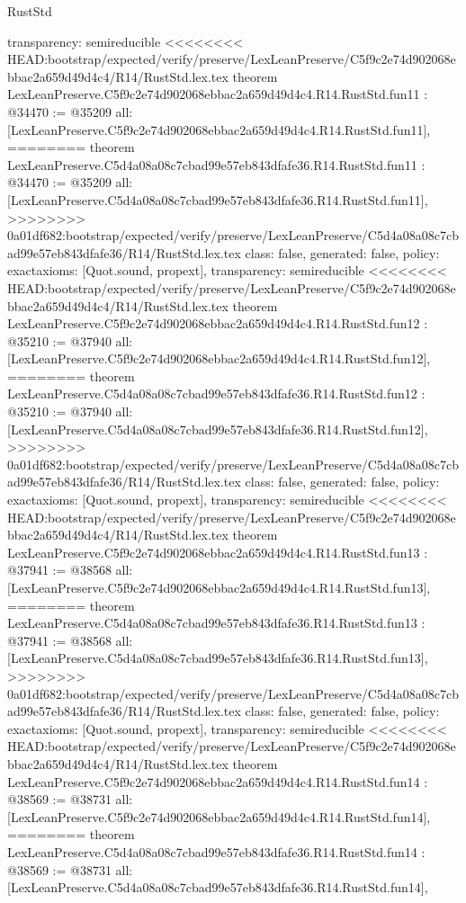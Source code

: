 \begin{lexlean}{RustStd}
\begin{coremodule}
{\begin{coremodule}
{{{{{{{{{{{{{{  transparency: semireducible
}
<<<<<<<< HEAD:bootstrap/expected/verify/preserve/LexLeanPreserve/C5f9c2e74d902068ebbac2a659d49d4c4/R14/RustStd.lex.tex
theorem LexLeanPreserve.C5f9c2e74d902068ebbac2a659d49d4c4.R14.RustStd.fun11 : @34470 := @35209 {
  all: [LexLeanPreserve.C5f9c2e74d902068ebbac2a659d49d4c4.R14.RustStd.fun11],
========
theorem LexLeanPreserve.C5d4a08a08c7cbad99e57eb843dfafe36.R14.RustStd.fun11 : @34470 := @35209 {
  all: [LexLeanPreserve.C5d4a08a08c7cbad99e57eb843dfafe36.R14.RustStd.fun11],
>>>>>>>> 0a01df682:bootstrap/expected/verify/preserve/LexLeanPreserve/C5d4a08a08c7cbad99e57eb843dfafe36/R14/RustStd.lex.tex
  class: false,
  generated: false,
  policy: exact{axioms: [Quot.sound, propext]},
  transparency: semireducible
}
<<<<<<<< HEAD:bootstrap/expected/verify/preserve/LexLeanPreserve/C5f9c2e74d902068ebbac2a659d49d4c4/R14/RustStd.lex.tex
theorem LexLeanPreserve.C5f9c2e74d902068ebbac2a659d49d4c4.R14.RustStd.fun12 : @35210 := @37940 {
  all: [LexLeanPreserve.C5f9c2e74d902068ebbac2a659d49d4c4.R14.RustStd.fun12],
========
theorem LexLeanPreserve.C5d4a08a08c7cbad99e57eb843dfafe36.R14.RustStd.fun12 : @35210 := @37940 {
  all: [LexLeanPreserve.C5d4a08a08c7cbad99e57eb843dfafe36.R14.RustStd.fun12],
>>>>>>>> 0a01df682:bootstrap/expected/verify/preserve/LexLeanPreserve/C5d4a08a08c7cbad99e57eb843dfafe36/R14/RustStd.lex.tex
  class: false,
  generated: false,
  policy: exact{axioms: [Quot.sound, propext]},
  transparency: semireducible
}
<<<<<<<< HEAD:bootstrap/expected/verify/preserve/LexLeanPreserve/C5f9c2e74d902068ebbac2a659d49d4c4/R14/RustStd.lex.tex
theorem LexLeanPreserve.C5f9c2e74d902068ebbac2a659d49d4c4.R14.RustStd.fun13 : @37941 := @38568 {
  all: [LexLeanPreserve.C5f9c2e74d902068ebbac2a659d49d4c4.R14.RustStd.fun13],
========
theorem LexLeanPreserve.C5d4a08a08c7cbad99e57eb843dfafe36.R14.RustStd.fun13 : @37941 := @38568 {
  all: [LexLeanPreserve.C5d4a08a08c7cbad99e57eb843dfafe36.R14.RustStd.fun13],
>>>>>>>> 0a01df682:bootstrap/expected/verify/preserve/LexLeanPreserve/C5d4a08a08c7cbad99e57eb843dfafe36/R14/RustStd.lex.tex
  class: false,
  generated: false,
  policy: exact{axioms: [Quot.sound, propext]},
  transparency: semireducible
}
<<<<<<<< HEAD:bootstrap/expected/verify/preserve/LexLeanPreserve/C5f9c2e74d902068ebbac2a659d49d4c4/R14/RustStd.lex.tex
theorem LexLeanPreserve.C5f9c2e74d902068ebbac2a659d49d4c4.R14.RustStd.fun14 : @38569 := @38731 {
  all: [LexLeanPreserve.C5f9c2e74d902068ebbac2a659d49d4c4.R14.RustStd.fun14],
========
theorem LexLeanPreserve.C5d4a08a08c7cbad99e57eb843dfafe36.R14.RustStd.fun14 : @38569 := @38731 {
  all: [LexLeanPreserve.C5d4a08a08c7cbad99e57eb843dfafe36.R14.RustStd.fun14],
}}}}}}}}}}}}}}}}}}
\end{coremodule}}
\end{coremodule}
\end{lexlean}
